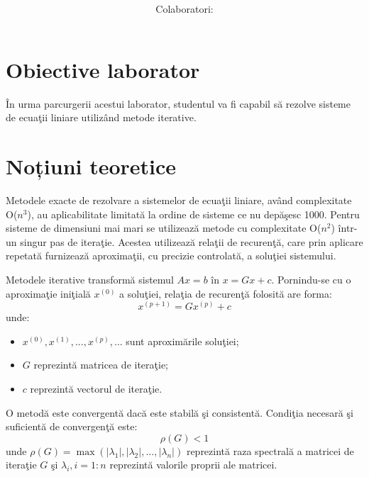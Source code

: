 \documentclass{exam}
\title{
	\textmd{\textbf{\MNLabTitle}}
	\author{Colaboratori: \MNAuthor}
}
\begin{document}
\begin{coverpages}

	\maketitle
	\tableofcontents

\end{coverpages}

\section{Obiective laborator}

\par \^{I}n urma parcurgerii acestui laborator, studentul va fi capabil s\u{a} rezolve sisteme de ecua\c{t}ii liniare utiliz\^{a}nd metode iterative.

\section{Noțiuni teoretice}

\par Metodele exacte de rezolvare a sistemelor de ecua\c{t}ii liniare, av\^{a}nd complexitate O(${n}^{3}$), au aplicabilitate limitat\u{a} la ordine de sisteme ce nu dep\u{a}\c{s}esc 1000. Pentru sisteme de dimensiuni mai mari se utilizeaz\u{a} metode cu complexitate O(${n}^{2}$) \^{i}ntr-un singur pas de itera\c{t}ie. Acestea utilizeaz\u{a} rela\c{t}ii de recuren\c{t}\u{a}, care prin aplicare repetat\u{a} furnizeaz\u{a} aproxima\c{t}ii, cu precizie controlat\u{a}, a solu\c{t}iei sistemului.


Metodele iterative transform\u{a}  sistemul $Ax = b$  \^{i}n $x = Gx + c$. Pornindu-se cu o aproxima\c{t}ie ini\c{t}ial\u{a} ${x}^{(0)}$ a solu\c{t}iei, rela\c{t}ia de recuren\c{t}\u{a}  folosit\u{a} are forma:
$${x}^{(p+1)} = G{x}^{(p)} + c$$
unde:
\begin{itemize}
	\item ${x}^{(0)}, {x}^{(1)}, ... , {x}^{(p)}, ...$ sunt aproxim\u{a}rile solu\c{t}iei;
	\item $G$ reprezint\u{a} matricea de itera\c{t}ie;
	\item $c$ reprezint\u{a} vectorul de itera\c{t}ie.
\end{itemize}

\par O metod\u{a} este convergent\u{a} dac\u{a} este stabil\u{a} \c{s}i consistent\u{a}. Condi\c{t}ia necesar\u{a} \c{s}i suficient\u{a} de convergen\c{t}\u{a} este:
$${\rho}(G) < 1$$
unde ${\rho}(G) = \max(|{\lambda}_{1}|, |{\lambda}_{2}|, ... , |{\lambda}_{n}|)$ reprezint\u{a} raza spectral\u{a} a matricei de itera\c{t}ie $G$ \c{s}i ${\lambda}_{i}, i = 1:n$ reprezint\u{a} valorile proprii ale matricei.
\end{document}
